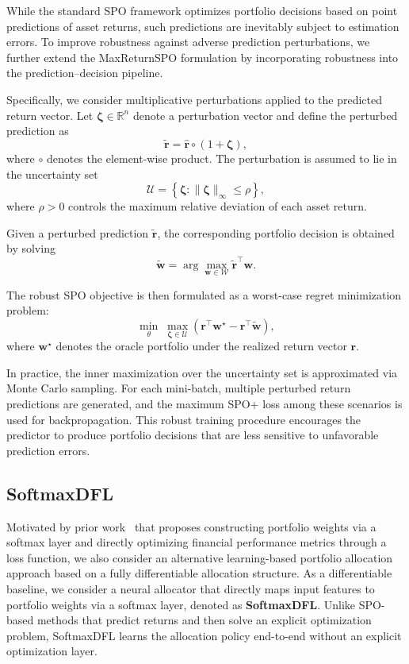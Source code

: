 \documentclass[review]{elsarticle}
\begin{document}
While the standard SPO framework optimizes portfolio decisions based on point
predictions of asset returns, such predictions are inevitably subject to
estimation errors.
To improve robustness against adverse prediction perturbations, we further
extend the MaxReturnSPO formulation by incorporating robustness into the
prediction--decision pipeline.

Specifically, we consider multiplicative perturbations applied to the predicted
return vector.
Let $\boldsymbol{\zeta}\in\mathbb{R}^n$ denote a perturbation vector and define
the perturbed prediction as
\begin{equation}
\tilde{\bm r}
=
\hat{\bm r} \circ (1+\boldsymbol{\zeta}),
\end{equation}
where $\circ$ denotes the element-wise product.
The perturbation is assumed to lie in the uncertainty set
\begin{equation}
\mathcal U
=
\left\{
\boldsymbol{\zeta} :
\|\boldsymbol{\zeta}\|_\infty \le \rho
\right\},
\end{equation}
where $\rho>0$ controls the maximum relative deviation of each asset return.

Given a perturbed prediction $\tilde{\bm r}$, the corresponding portfolio
decision is obtained by solving
\begin{equation}
\tilde{\bm w}
=
\arg\max_{\bm w\in\mathcal W}
\tilde{\bm r}^\top \bm w .
\end{equation}

The robust SPO objective is then formulated as a worst-case regret minimization
problem:
\begin{equation}
\min_{\theta}
\;
\max_{\boldsymbol{\zeta}\in\mathcal U}
\left(
\bm r^\top \bm w^\star
-
\bm r^\top \tilde{\bm w}
\right),
\end{equation}
where $\bm w^\star$ denotes the oracle portfolio under the realized return vector
$\bm r$.

In practice, the inner maximization over the uncertainty set is approximated via
Monte Carlo sampling.
For each mini-batch, multiple perturbed return predictions are generated, and
the maximum SPO+ loss among these scenarios is used for backpropagation.
This robust training procedure encourages the predictor to produce portfolio
decisions that are less sensitive to unfavorable prediction errors.

\subsection{SoftmaxDFL}
Motivated by prior work~\cite{Zhang2020DeepPortfolio} that proposes constructing
portfolio weights via a softmax layer and directly optimizing financial
performance metrics through a loss function, we also consider an alternative
learning-based portfolio allocation approach based on a fully differentiable
allocation structure.
As a differentiable baseline, we consider a neural allocator that directly maps
input features to portfolio weights via a softmax layer, denoted as
\textbf{SoftmaxDFL}.
Unlike SPO-based methods that predict returns and then solve an explicit
optimization problem, SoftmaxDFL learns the allocation policy end-to-end without
an explicit optimization layer.
\end{document}
